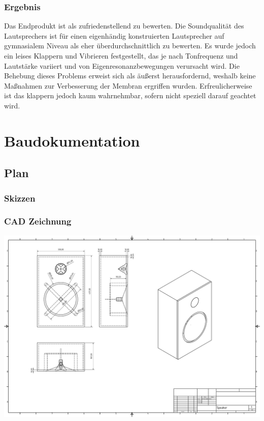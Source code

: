 \documentclass[a4paper,11pt]{report}
\begin{document}
\section{Ergebnis}
Das Endprodukt ist als zufriedenstellend zu bewerten. Die Soundqualität des Lautsprechers ist für einen eigenhändig konstruierten Lautsprecher auf gymnasialem Niveau als eher überdurchschnittlich zu bewerten. Es wurde jedoch ein leises Klappern und Vibrieren festgestellt, das je nach Tonfrequenz und Lautstärke variiert und von Eigenresonanzbewegungen verursacht wird. Die Behebung dieses Problems erweist sich als äußerst herausfordernd, weshalb keine Maßnahmen zur Verbesserung der Membran ergriffen wurden. Erfreulicherweise ist das klappern jedoch kaum wahrnehmbar, sofern nicht speziell darauf geachtet wird. 


\part{Baudokumentation}

\chapter{Plan}
\section{Skizzen}
\section{CAD Zeichnung}
\includegraphics[width=1\textwidth]{resources/pdf/Speaker.pdf}
\end{document}
